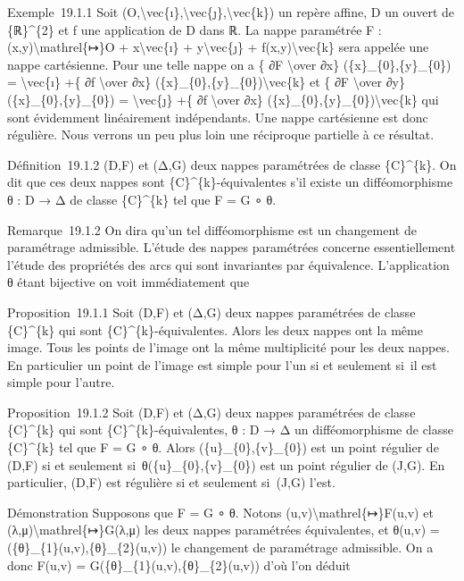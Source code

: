 \documentclass[]{article}
\begin{document}
Exemple~19.1.1 Soit
(O,\textbackslash{}vec\{ı\},\textbackslash{}vec\{ȷ\},\textbackslash{}vec\{k\})
un repère affine, D un ouvert de \{ℝ\}\^{}\{2\} et f une application de
D dans ℝ. La nappe paramétrée F : (x,y)\textbackslash{}mathrel\{↦\}O +
x\textbackslash{}vec\{ı\} + y\textbackslash{}vec\{ȷ\} +
f(x,y)\textbackslash{}vec\{k\} sera appelée une nappe cartésienne. Pour
une telle nappe on a \{ ∂F \textbackslash{}over ∂x\}
(\{x\}\_\{0\},\{y\}\_\{0\}) = \textbackslash{}vec\{ı\} +\{ ∂f
\textbackslash{}over ∂x\}
(\{x\}\_\{0\},\{y\}\_\{0\})\textbackslash{}vec\{k\} et \{ ∂F
\textbackslash{}over ∂y\} (\{x\}\_\{0\},\{y\}\_\{0\}) =
\textbackslash{}vec\{ȷ\} +\{ ∂f \textbackslash{}over ∂x\}
(\{x\}\_\{0\},\{y\}\_\{0\})\textbackslash{}vec\{k\} qui sont évidemment
linéairement indépendants. Une nappe cartésienne est donc régulière.
Nous verrons un peu plus loin une réciproque partielle à ce résultat.

Définition~19.1.2 (D,F) et (Δ,G) deux nappes paramétrées de classe
\{C\}\^{}\{k\}. On dit que ces deux nappes sont
\{C\}\^{}\{k\}-équivalentes s'il existe un difféomorphisme θ : D → Δ de
classe \{C\}\^{}\{k\} tel que F = G ∘ θ.

Remarque~19.1.2 On dira qu'un tel difféomorphisme est un changement de
paramétrage admissible. L'étude des nappes paramétrées concerne
essentiellement l'étude des propriétés des arcs qui sont invariantes par
équivalence. L'application θ étant bijective on voit immédiatement que

Proposition~19.1.1 Soit (D,F) et (Δ,G) deux nappes paramétrées de classe
\{C\}\^{}\{k\} qui sont \{C\}\^{}\{k\}-équivalentes. Alors les deux
nappes ont la même image. Tous les points de l'image ont la même
multiplicité pour les deux nappes. En particulier un point de l'image
est simple pour l'un si et seulement si~il est simple pour l'autre.

Proposition~19.1.2 Soit (D,F) et (Δ,G) deux nappes paramétrées de classe
\{C\}\^{}\{k\} qui sont \{C\}\^{}\{k\}-équivalentes, θ : D → Δ un
difféomorphisme de classe \{C\}\^{}\{k\} tel que F = G ∘ θ. Alors
(\{u\}\_\{0\},\{v\}\_\{0\}) est un point régulier de (D,F) si et
seulement si~θ(\{u\}\_\{0\},\{v\}\_\{0\}) est un point régulier de
(J,G). En particulier, (D,F) est régulière si et seulement si~(J,G)
l'est.

Démonstration Supposons que F = G ∘ θ. Notons
(u,v)\textbackslash{}mathrel\{↦\}F(u,v) et
(λ,μ)\textbackslash{}mathrel\{↦\}G(λ,μ) les deux nappes paramétrées
équivalentes, et θ(u,v) = (\{θ\}\_\{1\}(u,v),\{θ\}\_\{2\}(u,v)) le
changement de paramétrage admissible. On a donc F(u,v) =
G(\{θ\}\_\{1\}(u,v),\{θ\}\_\{2\}(u,v)) d'où l'on déduit
\end{document}
